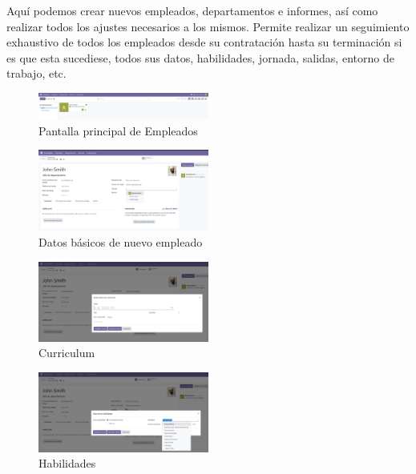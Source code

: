 \documentclass[a4paper,12pt]{article}
\begin{document}
Aquí podemos crear nuevos empleados, departamentos e informes, así como realizar todos los ajustes necesarios a los mismos. Permite realizar un seguimiento exhaustivo de todos los empleados desde su contratación hasta su terminación si es que esta sucediese, todos sus datos, habilidades, jornada, salidas, entorno de trabajo, etc.


\begin{figure}[h!]
    \centering
    \includegraphics[width=0.5\textwidth]{pr2odoo11-empleadosMain.png}
    \caption{Pantalla principal de Empleados}
\end{figure}
\FloatBarrier

\begin{figure}[h!]
    \centering
    \includegraphics[width=0.5\textwidth]{pr2odoo12-DatosBasicosDeNuevoEmpleado.png}
    \caption{Datos básicos de nuevo empleado}
\end{figure}
\FloatBarrier

\begin{figure}[h!]
    \centering
    \includegraphics[width=0.5\textwidth]{pr2odoo13-curriculum.png}
    \caption{Curriculum}
\end{figure}
\FloatBarrier

\begin{figure}[h!]
    \centering
    \includegraphics[width=0.5\textwidth]{pr2odoo14-habilidades.png}
    \caption{Habilidades}
\end{figure}
\FloatBarrier
\end{document}
